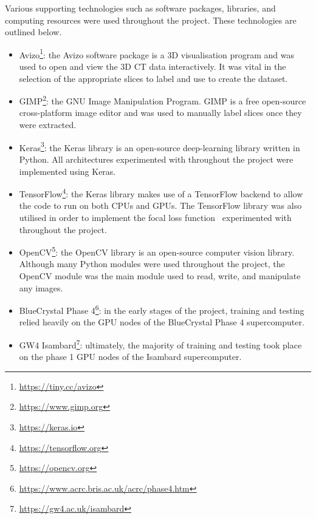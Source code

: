 Various supporting technologies such as software packages, libraries, and computing resources were used throughout the project. These technologies are outlined below.

\vspace{0.5cm} 

\begin{itemize}
\item Avizo\footnote{\url{https://tiny.cc/avizo}}: the Avizo software package is a 3D visualisation program and was used to open and view the 3D CT data interactively. It was vital in the selection of the appropriate slices to label and use to create the dataset.
\item GIMP\footnote{\url{https://www.gimp.org}}: the GNU Image Manipulation Program. GIMP is a free open-source cross-platform image editor and was used to manually label slices once they were extracted.
\item Keras\footnote{\url{https://keras.io}}: the Keras library is an open-source deep-learning library written in Python. All architectures experimented with throughout the project were implemented using Keras.
\item TensorFlow\footnote{\url{https://tensorflow.org}}: the Keras library makes use of a TensorFlow backend to allow the code to run on both CPUs and GPUs. The TensorFlow library was also utilised in order to implement the focal loss function~\cite{focalloss} experimented with throughout the project.
\item OpenCV\footnote{\url{https://opencv.org}}: the OpenCV library is an open-source computer vision library. Although many Python modules were used throughout the project, the OpenCV module was the main module used to read, write, and manipulate any images.
\item BlueCrystal Phase 4\footnote{\url{https://www.acrc.bris.ac.uk/acrc/phase4.htm}}: in the early stages of the project, training and testing relied heavily on the GPU nodes of the BlueCrystal Phase 4 supercomputer.
\item GW4 Isambard\footnote{\url{https://gw4.ac.uk/isambard}}: ultimately, the majority of training and testing took place on the phase 1 GPU nodes of the Isambard supercomputer.
\end{itemize}